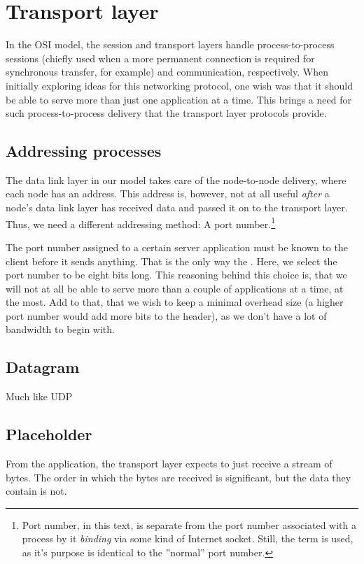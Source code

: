 \section{Transport layer}
In the OSI model, the session and transport layers handle process-to-process sessions (chiefly used when a more permanent connection is required for synchronous transfer, for example) and communication, respectively. When initially exploring ideas for this networking protocol, one wish was that it should be able to serve more than just one application at a time. This brings a need for such process-to-process delivery that the transport layer protocols provide.

\subsection{Addressing processes}
The data link layer in our model takes care of the node-to-node delivery, where each node has an address. This address is, however, not at all useful \textit{after} a node's data link layer has received data and passed it on to the transport layer. Thus, we need a different addressing method: A port number.\footnote{Port number, in this text, is separate from the port number associated with a process by it \textit{binding} via some kind of Internet socket. Still, the term is used, as it's purpose is identical to the ''normal'' port number.}

The port number assigned to a certain server application must be known to the client before it sends anything. That is the only way the . Here, we select the port number to be eight bits long. This reasoning behind this choice is, that we will not at all be able to serve more than a couple of applications at a time, at the most. Add to that, that we wish to keep a minimal overhead size (a higher port number would add more bits to the header), as we don't have a lot of bandwidth to begin with.

\subsection{Datagram}

Much like UDP


\subsection{Placeholder}
From the application, the transport layer expects to just receive a stream of bytes. The order in which the bytes are received is significant, but the data they contain is not.

